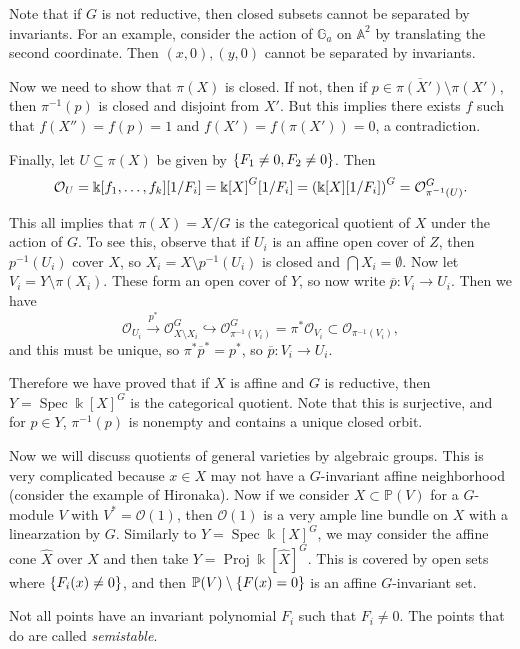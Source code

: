 \documentclass[leqno, openany]{memoir}
\theoremstyle{definition}
\theoremstyle{remark}
\theoremstyle{plain}
\theoremstyle{definition}
\theoremstyle{remark}
\newcommand{\A}{\mathbb{A}}
\renewcommand{\k}{\Bbbk}
\renewcommand{\P}{\mathbb{P}}
\newcommand{\mc}[1]{\mathcal{#1}}
\newcommand{\ol}[1]{\overline{#1}}
\newcommand{\wh}[1]{\widehat{#1}}
\DeclareMathOperator{\Spec}{Spec}
\DeclareMathOperator{\Proj}{Proj}
\begin{document}
Note that if $G$ is not reductive, then closed subsets cannot be separated by
invariants. For an example, consider the action of $\mathbb{G}_a$ on $\A^2$ by
translating the second coordinate. Then $(x,0), (y,0)$ cannot be separated by
invariants.

Now we need to show that $\pi(X)$ is closed. If not, then if $p \in
\ol{\pi(X')} \setminus \pi(X')$, then $\pi^{-1}(p)$ is closed and disjoint from
$X'$. But this implies there exists $f$ such that $f(X'') = f(p) = 1$ and
$f(X') = f(\pi(X')) = 0$, a contradiction.

Finally, let $U \subseteq \pi(X)$ be given by $\qty{F_1 \neq 0 , F_2 \neq 0}$.
Then \[ \mc{O}_U = \k[f_1, \ldots, f_k][1/F_i] = {\k[X]}^G[1/F_i] =
{\qty(\k[X][1/F_i])}^G = \mc{O}_{\pi^{-1}(U)}^G. \]

This all implies that $\pi(X) = X/G$ is the categorical quotient of $X$ under
the action of $G$. To see this, observe that if $U_i$ is an affine open cover
of $Z$, then $p^{-1}(U_i)$ cover $X$, so $X_i = X \setminus p^{-1}(U_i)$ is
closed and $\bigcap X_i = \emptyset$. Now let $V_i = Y \setminus \pi(X_i)$.
These form an open cover of $Y$, so now write $\ol{p} \colon V_i \to U_i$. Then
we have \[ \mc{O}_{U_i} \xrightarrow{p^*} \mc{O}_{X\setminus X_i}^G
\hookrightarrow \mc{O}_{\pi^{-1}(V_i)}^G = \pi^* \mc{O}_{V_i} \subset
\mc{O}_{\pi^{-1}(V_i)}, \] and this must be unique, so $\pi^* \ol{p}^* = p^*$,
so $\ol{p} \colon V_i \to U_i$.

Therefore we have proved that if $X$ is affine and $G$ is reductive, then $Y =
\Spec {\k[X]}^G$ is the categorical quotient. Note that this is surjective, and
for $p \in Y$, $\pi^{-1}(p)$ is nonempty and contains a unique closed orbit.

Now we will discuss quotients of general varieties by algebraic groups. This is
very complicated because $x \in X$ may not have a $G$-invariant affine
neighborhood (consider the example of Hironaka). Now if we consider $X \subset
\P(V)$ for a $G$-module $V$ with $V^* = \mc{O}(1)$, then $\mc{O}(1)$ is a very
ample line bundle on $X$ with a linearzation by $G$. Similarly to $Y = \Spec
{\k[X]}^G$, we may consider the affine cone $\wh{X}$ over $X$ and then take $Y
= \Proj {\k[\wh{X}]}^G$. This is covered by open sets where $\qty{F_i(x) \neq
0}$, and then $\P(V) \setminus \qty{F(x) =0}$ is an affine $G$-invariant set.

Not all points have an invariant polynomial $F_i$ such that $F_i \neq 0$. The
points that do are called \textit{semistable}.
\end{document}
